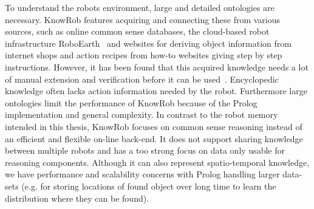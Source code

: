 \documentclass[a4paper,11pt]{article}
\begin{document}
To understand the robots environment, large and detailed ontologies are
necessary. KnowRob features acquiring and connecting these from
various sources, such as online common sense databases, the cloud-based
robot infrastructure RoboEarth~\cite{roboearth} and websites for
deriving object information from internet shops and action recipes
from how-to websites giving step by step instructions.
However, it has been found that this acquired
knowledge needs a lot of manual extension and verification before it
can be used~\cite{KnowRob-Web}. Encyclopedic knowledge often lacks
action information needed by the robot. %
%
Furthermore large ontologies limit the performance of KnowRob because
of the Prolog implementation and general complexity. In contrast to
the robot memory intended in this thesis, KnowRob focuses on common
sense reasoning instead of an efficient and flexible on-line
back-end. It does not support sharing knowledge between multiple
robots and has a too strong focus on data only usable for reasoning
components. Although it can also represent spatio-temporal knowledge,
we have performance and scalability concerns with Prolog handling
larger data-sets (e.g. for storing locations of found object over long
time to learn the distribution where they can be found).
\end{document}

